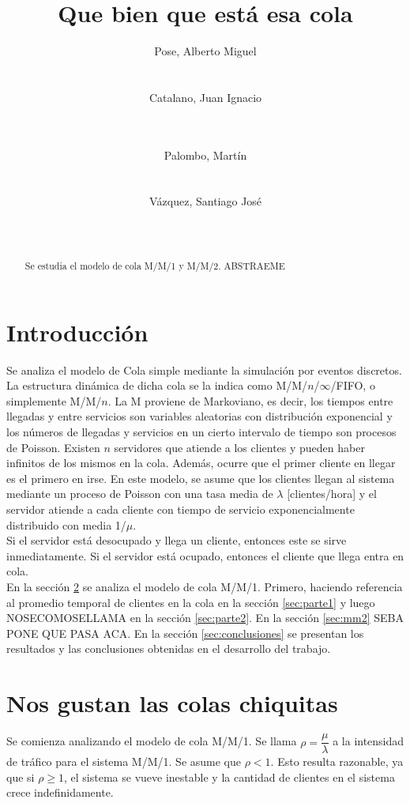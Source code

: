 \documentclass{sig-alternate}
\title{Que bien que est\'a esa cola}
\author{
\alignauthor
Pose, Alberto Miguel\\
       \affaddr{Instituto Tecnol\'ogico de Buenos Aires}\\
       \affaddr{Buenos Aires, Argentina}\\
       \email{apose@alu.itba.edu.ar}
\alignauthor
Catalano, Juan Ignacio\\
       \affaddr{Instituto Tecnol\'ogico de Buenos Aires}\\
       \affaddr{Buenos Aires, Argentina}\\
       \email{jcatalan@alu.itba.edu.ar}
\and
\alignauthor 
Palombo, Mart\'in\\
       \affaddr{Instituto Tecnol\'ogico de Buenos Aires}\\
       \affaddr{Buenos Aires, Argentina}\\
       \email{mpalombo@alu.itba.edu.ar}
\alignauthor 
V\'azquez, Santiago Jos\'e\\
       \affaddr{Instituto Tecnol\'ogico de Buenos Aires}\\
       \affaddr{Buenos Aires, Argentina}\\
       \email{savazque@alu.itba.edu.ar}
}
\date{}
\begin{document}
\maketitle

\begin{abstract}
Se estudia el modelo de cola M/M/1 y M/M/2. ABSTRAEME
\end{abstract} 

\newpage

\section{Introducci\'on}

Se analiza el modelo de Cola simple mediante la simulaci\'on por eventos discretos.
La estructura din\'amica de dicha cola se la indica como M/M/$n$/$\infty$/FIFO, o simplemente M/M/$n$.
La M proviene de Markoviano, es decir, los tiempos entre llegadas y entre servicios son variables
aleatorias con distribuci\'on exponencial y los n\'umeros de llegadas y servicios en un cierto
intervalo de tiempo son procesos de Poisson.  Existen $n$ servidores que atiende a los clientes
y pueden haber infinitos de los mismos en la cola. Adem\'as, ocurre que el primer cliente en llegar es el primero en irse.
En este modelo, se asume que los clientes llegan al sistema mediante un proceso de Poisson con una tasa
media de $\lambda$ [clientes/hora] y el servidor atiende a cada cliente con tiempo de servicio exponencialmente
distribuido con media 1/$\mu$. \\
Si el servidor est\'a desocupado y llega un cliente, entonces este se sirve inmediatamente. Si el servidor est\'a
ocupado, entonces el cliente que llega entra en cola. \\
En la secci\'on \ref{sec:mm1} se analiza el modelo de cola M/M/1. Primero, haciendo referencia al
promedio temporal de clientes en la cola en la secci\'on \ref{sec:parte1} y luego
NOSECOMOSELLAMA en la secci\'on \ref{sec:parte2}.
En la secci\'on \ref{sec:mm2} SEBA PONE QUE PASA ACA.
En la secci\'on \ref{sec:conclusiones} se presentan los resultados y las conclusiones obtenidas en el desarrollo del trabajo.
\section{Nos gustan las colas chiquitas}
\label{sec:mm1}

Se comienza analizando el modelo de cola M/M/1.
Se llama $\rho = \dfrac{\mu}{\lambda}$ a la intensidad de tráfico para el sistema M/M/1.
Se asume que $\rho < 1$. Esto resulta razonable, ya que si $\rho \geq 1$, el sistema se vueve inestable y la cantidad
de clientes en el sistema crece indefinidamente.
\end{document}
